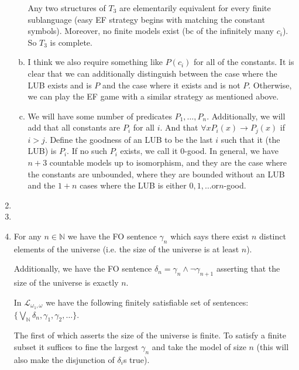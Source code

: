 \documentclass[10pt]{article}
\newcommand{\N}{\mathbb{N}}
\newcommand{\A}{\forall}
\newcommand{\mcL}{\mathcal{L}}
\begin{document}
\begin{enumerate}[1.]
\begin{enumerate}[a)]
\begin{enumerate}[i)]
      \end{enumerate}

   Any two structures of \(T_3\) are elementarily equivalent for every finite sublanguage (easy EF strategy begins with matching the constant symbols). Moreover, no finite models exist (bc of the infinitely many \(c_i\)). So \(T_3\) is complete. 

    \item I think we also require something like \(P(c_i)\) for all of the constants. It is clear that we can additionally distinguish between the case where the LUB exists and is \(P\) and the case where it exists and is not \(P\). Otherwise, we can play the EF game with a similar strategy as mentioned above. 

    \item We will have some number of predicates \(P_1, \ldots, P_n\). Additionally, we will add that all constants are \(P_i\) for all \(i\). And that \(\A x P_i(x) \to P_j(x)\) if \(i > j\). Define the goodness of an LUB to be the last \(i\) such that it (the LUB) is \(P_i\). If no such \(P_i\) exists, we call it \(0\)-good.  In general, we have \(n+3\) countable models up to isomorphism, and they are the case where the constants are unbounded, where they are bounded without an LUB and the \(1+n\) cases where the LUB is either \(0, 1, \ldots \text{or} n\)-good. 

  \end{enumerate}

 
\item
 
\item

\item For any \(n \in \N\) we have the FO sentence \(\gamma_n\) which says there exist \(n\) distinct elements of the universe (i.e. the size of the universe is at least \(n\)). 

Additionally, we have the FO sentence \(\delta_n = \gamma_n \land \neg \gamma_{n+1}\) asserting that the size of the universe is exactly \(n\). 

In \(\mcL_{\omega_1, \omega}\) we have the following finitely satisfiable set of sentences: \(\{\bigvee_\N \delta_n, \gamma_1, \gamma_2, \ldots\}\).

The first of which asserts the size of the universe is finite. To satisfy a finite subset it suffices to fine the largest \(\gamma_n\) and take the model of size \(n\) (this will also make the disjunction of \(\delta_i\)s true). 


\end{enumerate}
\end{document}
